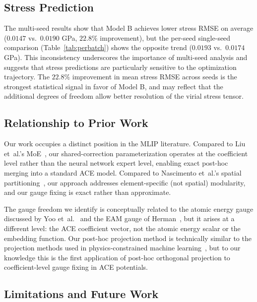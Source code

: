 \documentclass[twoside,prb,aps,floatfix,superscriptaddress,longbibliography]{revtex4-2}
\begin{document}
\subsection{Stress Prediction}

The multi-seed results show that Model B achieves lower stress RMSE on average ($0.0147$ vs.\ $0.0190$ GPa, $22.8\%$ improvement), but the per-seed single-seed comparison (Table~\ref{tab:perbatch}) shows the opposite trend ($0.0193$ vs.\ $0.0174$ GPa). This inconsistency underscores the importance of multi-seed analysis and suggests that stress predictions are particularly sensitive to the optimization trajectory. The $22.8\%$ improvement in mean stress RMSE across seeds is the strongest statistical signal in favor of Model B, and may reflect that the additional degrees of freedom allow better resolution of the virial stress tensor.

\subsection{Relationship to Prior Work}

Our work occupies a distinct position in the MLIP literature. Compared to Liu et~al.'s MoE~\cite{Liu2026ScalingMoE}, our shared-correction parameterization operates at the coefficient level rather than the neural network expert level, enabling exact post-hoc merging into a standard ACE model. Compared to Nascimento et~al.'s spatial partitioning~\cite{Nascimento2026MoEFramework}, our approach addresses element-specific (not spatial) modularity, and our gauge fixing is exact rather than approximate.

The gauge freedom we identify is conceptually related to the atomic energy gauge discussed by Yoo et~al.~\cite{Yoo2019AtomicEnergyMapping} and the EAM gauge of Herman~\cite{Herman2008EAMGauge}, but it arises at a different level: the ACE coefficient vector, not the atomic energy scalar or the embedding function. Our post-hoc projection method is technically similar to the projection methods used in physics-constrained machine learning~\cite{PINNProj2024,KKThPINN2024}, but to our knowledge this is the first application of post-hoc orthogonal projection to coefficient-level gauge fixing in ACE potentials.

\subsection{Limitations and Future Work}
\end{document}

